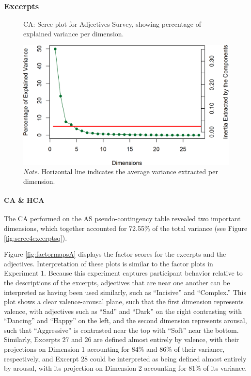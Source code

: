 \documentclass[
  english,
  man,floatsintext]{apa6}
\let\oldparagraph\paragraph
\renewcommand{\paragraph}[1]{\oldparagraph{#1}\mbox{}}
\begin{document}
\hypertarget{excerpts-1}{%
\subsubsection{Excerpts}\label{excerpts-1}}

\begin{figure}  
  \begin{center}
  \caption{CA: Scree plot for Adjectives Survey, showing percentage of explained variance per dimension.}
    \includegraphics{./Music-Descriptor-Space_files/figure-latex/scree4descriptorscode-1.png}
  \caption*{\footnotesize \textit{Note.} Horizontal line indicates the average variance extracted per dimension. }\label{fig:scree4descriptors}  
 \end{center}
\end{figure}

\hypertarget{ca-hca}{%
\paragraph{CA \& HCA}\label{ca-hca}}

The CA performed on the AS pseudo-contingency table revealed two important dimensions, which together accounted for 72.55\% of the total variance (see Figure \ref{fig:scree4excerptsq}).

Figure \ref{fig:factormapsA} displays the factor scores for the excerpts and the adjectives. Interpretation of these plots is similar to the factor plots in Experiment 1. Because this experiment captures participant behavior relative to the descriptions of the excerpts, adjectives that are near one another can be interpreted as having been used similarly, such as ``Incisive'' and ``Complex.'' This plot shows a clear valence-arousal plane, such that the first dimension represents valence, with adjectives such as ``Sad'' and ``Dark'' on the right contrasting with ``Dancing'' and ``Happy'' on the left, and the second dimension represents arousal, such that ``Aggressive'' is contrasted near the top with ``Soft'' near the bottom. Similarly, Excerpts 27 and 26 are defined almost entirely by valence, with their projections on Dimension 1 accounting for 84\% and 86\% of their variance, respectively, and Excerpt 28 could be interpreted as being defined almost entirely by arousal, with its projection on Dimension 2 accounting for 81\% of its variance.
\end{document}
